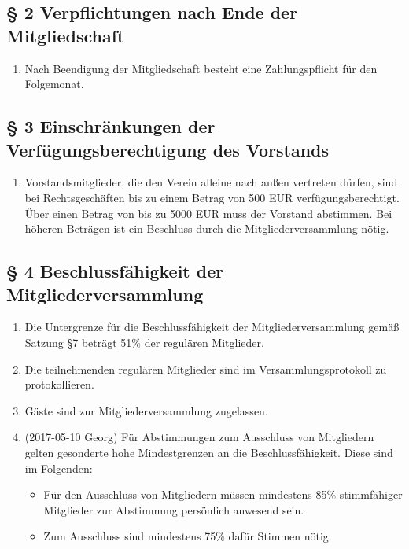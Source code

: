 \documentclass[10pt,a4paper]{article}
\begin{document}
%
%
\subsection*{§ 2 Verpflichtungen nach Ende der Mitgliedschaft}
\begin{enumerate}
\item Nach Beendigung der Mitgliedschaft besteht eine Zahlungspflicht für den Folgemonat.
\end{enumerate}
%
%
\subsection*{§ 3 Einschränkungen der Verfügungsberechtigung des Vorstands}
\begin{enumerate}
\item Vorstandsmitglieder, die den Verein alleine nach außen vertreten
    dürfen, sind bei Rechtsgeschäften bis zu einem Betrag von 500 EUR
    verfügungsberechtigt. Über einen Betrag von bis zu 5000 EUR muss der
    Vorstand abstimmen. Bei höheren Beträgen ist ein Beschluss durch die
    Mitgliederversammlung nötig.
\end{enumerate}
%
%
\subsection*{§ 4 Beschlussfähigkeit der Mitgliederversammlung}
\begin{enumerate}
\item Die Untergrenze für die Beschlussfähigkeit der Mitgliederversammlung
    gemäß Satzung §7 beträgt 51\% der regulären Mitglieder.
\item Die teilnehmenden regulären Mitglieder sind im Versammlungsprotokoll zu protokollieren.
\item Gäste sind zur Mitgliederversammlung zugelassen.
\item (2017-05-10 Georg) Für Abstimmungen zum Ausschluss von Mitgliedern gelten gesonderte hohe Mindestgrenzen an die Beschlussfähigkeit. Diese sind im Folgenden:
    \begin{itemize}
		\item Für den Ausschluss von Mitgliedern müssen mindestens 85\% stimmfähiger Mitglieder zur Abstimmung persönlich anwesend sein.
		\item Zum Ausschluss sind mindestens 75\% dafür Stimmen nötig.
	\end{itemize}
\end{enumerate}
%
%
\end{document}
